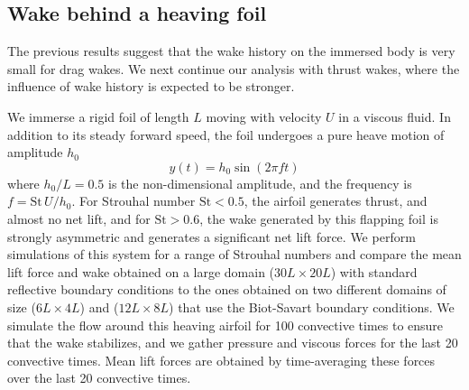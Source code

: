 \documentclass[final,1p,times]{elsarticle}
\begin{document}
\subsection{Wake behind a heaving foil}

The previous results suggest that the wake history on the immersed body is very small for drag wakes. We next continue our analysis with thrust wakes, where the influence of wake history is expected to be stronger.

We immerse a rigid foil of length $L$ moving with velocity $U$ in a viscous fluid. In addition to its steady forward speed, the foil undergoes a pure heave motion of amplitude $h_0$
\begin{equation}
    y(t) = h_0 \sin(2\pi f t)
\end{equation}
where $h_0/L=0.5$ is the non-dimensional amplitude, and the frequency is $f = \text{St}\,U/h_0$. For Strouhal number $\text{St}<0.5$, the airfoil generates thrust, and almost no net lift, and for $\text{St}>0.6$, the wake generated by this flapping foil is strongly asymmetric and generates a significant net lift force. We perform simulations of this system for a range of Strouhal numbers and compare the mean lift force and wake obtained on a large domain ($30L\times20L$) with standard reflective boundary conditions to the ones obtained on two different domains of size ($6L\times4L$) and ($12L\times8L$) that use the Biot-Savart boundary conditions. We simulate the flow around this heaving airfoil for 100 convective times to ensure that the wake stabilizes, and we gather pressure and viscous forces for the last 20 convective times. Mean lift forces are obtained by time-averaging these forces over the last 20 convective times.
\end{document}
